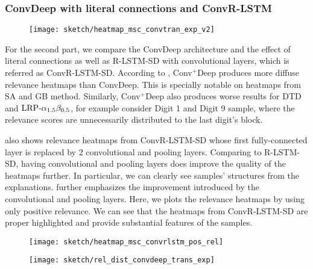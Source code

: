 \subsubsection{ConvDeep with literal connections and ConvR-LSTM}
 \begin{figure}[!htb]
\centering
\texttt{[image: sketch/heatmap\_msc\_convtran\_exp\_v2]}
\label{fig:heatmap_msc_convtran_exp}
\end{figure}
For the second part, we compare the ConvDeep architecture and the effect of literal connections as well as R-LSTM-SD with convolutional layers, which is referred as ConvR-LSTM-SD. According to \addfigure{\ref{fig:heatmap_msc_convtran_exp}}, Conv$^+$Deep produces more diffuse relevance heatmaps than ConvDeep. This is specially notable on heatmaps from SA  and GB method. Similarly, Conv$^+$Deep also produces worse results for DTD and $\text{LRP-}\alpha_{1.5}\beta_{0.5}$, for example consider Digit 1 and Digit 9 sample, where the relevance scores are unnecessarily distributed to the last digit's block. 

\addfigure{\ref{fig:heatmap_msc_convtran_exp}} also shows relevance heatmaps from ConvR-LSTM-SD whose first fully-connected layer is replaced by 2 convolutional and pooling layers. Comparing to R-LSTM-SD, having convolutional and pooling layers does improve  the quality of the heatmaps further. In particular, we can clearly see samples' structures from the explanations. \addfigure{\ref{fig:heatmap_msc_convrlstm_pos_rel}} further emphasizes the improvement introduced by the convolutional and pooling layers. Here, we plots the relevance heatmaps by using only positive relevance. We can see that the heatmaps from ConvR-LSTM-SD are proper highlighted and provide substantial  features of the samples.

 \begin{figure}[!htb]
\centering
\texttt{[image: sketch/heatmap\_msc\_convrlstm\_pos\_rel]}
\label{fig:heatmap_msc_convrlstm_pos_rel}
\end{figure}

 \begin{figure}[!htb]
\centering
\texttt{[image: sketch/rel\_dist\_convdeep\_trans\_exp]}
\label{fig:rel_dist_convdeep_trans_exp}
\end{figure}

